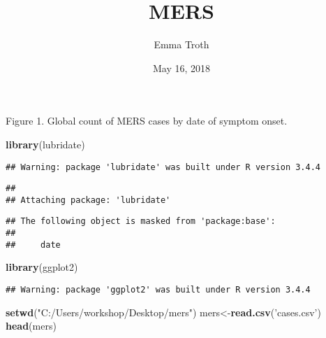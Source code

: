 \documentclass[]{article}
\title{MERS}
\author{Emma Troth}
\date{May 16, 2018}
\newenvironment{Shaded}{\begin{snugshade}}{\end{snugshade}}
\newcommand{\KeywordTok}[1]{\textcolor[rgb]{0.13,0.29,0.53}{\textbf{{#1}}}}
\newcommand{\StringTok}[1]{\textcolor[rgb]{0.31,0.60,0.02}{{#1}}}
\newcommand{\NormalTok}[1]{{#1}}
\begin{document}
\maketitle

Figure 1. Global count of MERS cases by date of symptom onset.

\begin{Shaded}
\begin{Highlighting}[]
\KeywordTok{library}\NormalTok{(lubridate)}
\end{Highlighting}
\end{Shaded}

\begin{verbatim}
## Warning: package 'lubridate' was built under R version 3.4.4
\end{verbatim}

\begin{verbatim}
## 
## Attaching package: 'lubridate'
\end{verbatim}

\begin{verbatim}
## The following object is masked from 'package:base':
## 
##     date
\end{verbatim}

\begin{Shaded}
\begin{Highlighting}[]
\KeywordTok{library}\NormalTok{(ggplot2) }
\end{Highlighting}
\end{Shaded}

\begin{verbatim}
## Warning: package 'ggplot2' was built under R version 3.4.4
\end{verbatim}

\begin{Shaded}
\begin{Highlighting}[]
\KeywordTok{setwd}\NormalTok{(}\StringTok{"C:/Users/workshop/Desktop/mers"}\NormalTok{)}
\NormalTok{mers<-}\KeywordTok{read.csv}\NormalTok{(}\StringTok{'cases.csv'}\NormalTok{)}
\KeywordTok{head}\NormalTok{(mers)}
\end{Highlighting}
\end{Shaded}
\end{document}
